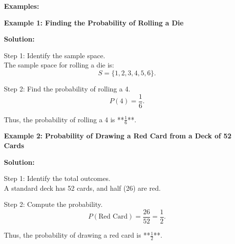 \textbf{Examples:}

\begin{flushleft}
	\textbf{Example 1: Finding the Probability of Rolling a Die}
	
	\textbf{Solution:}
	
	Step 1: Identify the sample space. \\
	The sample space for rolling a die is:
	\[
	S = \{1,2,3,4,5,6\}.
	\]
	
	Step 2: Find the probability of rolling a 4.
	\[
	P(4) = \frac{1}{6}.
	\]
	
	Thus, the probability of rolling a 4 is **$\frac{1}{6}$**.
\end{flushleft}

\begin{flushleft}
	\textbf{Example 2: Probability of Drawing a Red Card from a Deck of 52 Cards}
	
	\textbf{Solution:}
	
	Step 1: Identify the total outcomes. \\
	A standard deck has 52 cards, and half (26) are red.
	
	Step 2: Compute the probability.
	\[
	P(\text{Red Card}) = \frac{26}{52} = \frac{1}{2}.
	\]
	
	Thus, the probability of drawing a red card is **$\frac{1}{2}$**.
\end{flushleft}
